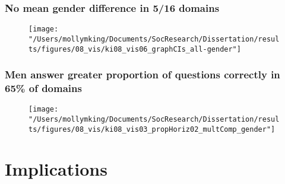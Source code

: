 \documentclass[pdf]{beamer}
\begin{document}
\begin{frame}
\frametitle{No mean gender difference in 5/16 domains}
  \begin{figure}[ht]
    \begin{center}
      \texttt{[image: "/Users/mollymking/Documents/SocResearch/Dissertation/results/figures/08\_vis/ki08\_vis06\_graphCIs\_all-gender"]}
    \end{center}
  \end{figure}

\end{frame}


\begin{frame}
\frametitle{Men answer greater proportion of questions correctly in 65\% of domains}
  \begin{figure}[ht]
    \begin{center}
      \texttt{[image: "/Users/mollymking/Documents/SocResearch/Dissertation/results/figures/08\_vis/ki08\_vis03\_propHoriz02\_multComp\_gender"]}
    \end{center}
  \end{figure}

\end{frame}





\section{Implications}

\end{document}
